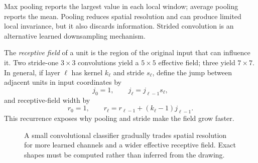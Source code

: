 Max pooling reports the largest value in each local window; average pooling
reports the mean. Pooling reduces spatial resolution and can produce limited
local invariance, but it also discards information. Strided convolution is an
alternative learned downsampling mechanism.

The \emph{receptive field} of a unit is the region of the original input that
can influence it. Two stride-one $3\times3$ convolutions yield a $5\times5$
effective field; three yield $7\times7$. In general, if layer $\ell$ has
kernel $k_\ell$ and stride $s_\ell$, define the jump between adjacent units in
input coordinates by
\[
 j_0=1,
 \qquad j_\ell=j_{\ell-1}s_\ell,
\]
and receptive-field width by
\[
 r_0=1,
 \qquad r_\ell=r_{\ell-1}+(k_\ell-1)j_{\ell-1}.
\]
This recurrence exposes why pooling and stride make the field grow faster.

\begin{figure}[htbp]
\centering
{}
\caption{A small convolutional classifier gradually trades spatial resolution
for more learned channels and a wider effective receptive field. Exact shapes
must be computed rather than inferred from the drawing.}
\label{fig:cnn-shape-story}
\end{figure}

